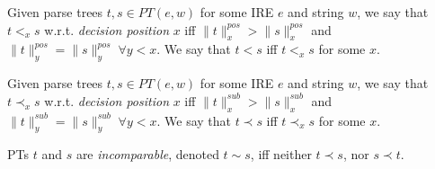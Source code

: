 \documentclass[AMA,STIX1COL]{WileyNJD-v2}
\newcommand{\pnorm}[2]{\|{#1}\|^{pos}_{#2}}
\newcommand{\snorm}[2]{\|{#1}\|^{sub}_{#2}}
\begin{document}
    \begin{definition}
    \label{total_order_on_PTs}
    Given parse trees $t, s \in PT(e, w)$ for some IRE $e$ and string $w$, we say that $t <_x s$ w.r.t. \emph{decision position} $x$
    iff $\pnorm{t}{x} > \pnorm{s}{x}$ and $\pnorm{t}{y} = \pnorm{s}{y} \; \forall y < x$.
    We say that $t < s$ iff $t <_x s$ for some $x$.
    \end{definition}

    \begin{definition}
    \label{partial_order_on_PTs}
    Given parse trees $t, s \in PT(e, w)$ for some IRE $e$ and string $w$, we say that $t \prec_x s$ w.r.t. \emph{decision position} $x$ %
    iff $\snorm{t}{x} > \snorm{s}{x}$ and $\snorm{t}{y} = \snorm{s}{y} \; \forall y < x$.
    We say that $t \prec s$ iff $t \prec_x s$ for some $x$.
    \end{definition}

    \begin{definition}\label{incomparable_PTs}
    PTs $t$ and $s$ are \emph{incomparable}, denoted $t \sim s$,
    iff neither $t \prec s$, nor $s \prec t$.
    \end{definition}
\end{document}

